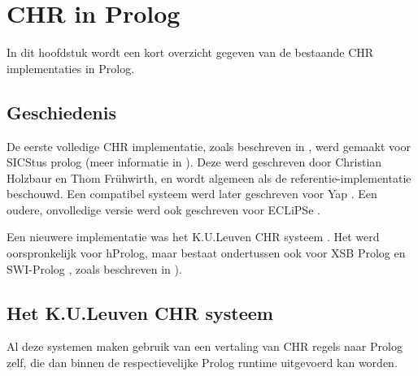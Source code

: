 \chapter{CHR in Prolog}

In dit hoofdstuk wordt een kort overzicht gegeven van de bestaande CHR implementaties in Prolog.

\section{Geschiedenis}

De eerste volledige CHR implementatie, zoals beschreven in \cite{christian:system}, werd gemaakt voor SICStus prolog (meer informatie in \cite{sicstus}). Deze werd geschreven door Christian Holzbaur en Thom Fr\"uhwirth, en wordt algemeen als de referentie-implementatie beschouwd. Een compatibel systeem werd later geschreven voor Yap \cite{yap}. Een oudere, onvolledige versie werd ook geschreven voor ECLiPSe \cite{eclipse}.

Een nieuwere implementatie was het K.U.Leuven CHR systeem \cite{tom:kulchr}. Het werd oorspronkelijk voor hProlog, maar bestaat ondertussen ook voor XSB Prolog \cite{xsb} en SWI-Prolog \cite{swiprolog}, zoals beschreven in \cite{tom:swi:wclp2005}).

\section{Het K.U.Leuven CHR systeem}

Al deze systemen maken gebruik van een vertaling van CHR regels naar Prolog zelf, die dan binnen de respectievelijke Prolog runtime uitgevoerd kan worden.